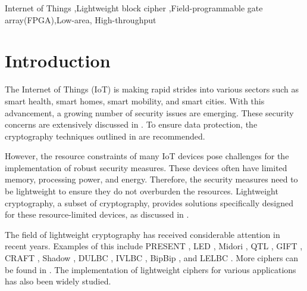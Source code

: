 \documentclass[final,5p,times,twocolumn]{elsarticle}
\begin{document}
\begin{frontmatter}
    \begin{keyword}
        Internet of Things  \sep Lightweight block cipher \sep Field-programmable gate array(FPGA)\sep  Low-area, High-throughput

    \end{keyword}

\end{frontmatter}




\section{Introduction}\label{sec1}

The Internet of Things (IoT) is making rapid strides into various sectors such as smart health, smart homes, smart mobility, and smart cities. With this advancement, a growing number of security issues are emerging.
These security concerns are extensively discussed in \cite{Meneghello2019a}.
To ensure data protection, the cryptography techniques outlined in \cite{Swessi2022} are recommended.

However, the resource constraints of many IoT devices pose challenges for the implementation of robust security measures. These devices often have limited memory, processing power, and energy. Therefore, the security measures need to be lightweight to ensure they do not overburden the resources. Lightweight cryptography, a subset of cryptography, provides solutions specifically designed for these resource-limited devices, as discussed in \cite{Mohajerani2020}.

The field of lightweight cryptography has received considerable attention in recent years. Examples of this include PRESENT \cite{Bogdanov2007}, LED \cite{Guo2011}, Midori \cite{Banik2015a}, QTL \cite{Li2016}, GIFT \cite{Banik2017}, CRAFT \cite{Beierle2019}, Shadow \cite{Guo2021}, DULBC \cite{Yang2022}, IVLBC \cite{Huang2023}, BipBip \cite{Belkheyar2023}, and LELBC \cite{Song2024}. More ciphers can be found in \cite{Zakaria2023}. The implementation of lightweight ciphers for various applications has also been widely studied.
\end{document}
